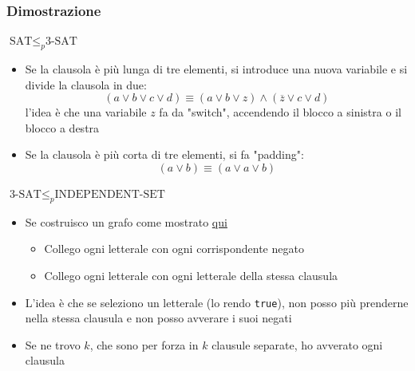 \subsubsection{Dimostrazione}
$ \text{SAT} \leq_p \text{3-SAT} $
\begin{itemize}
	\item Se la clausola è più lunga di tre elementi, si introduce una nuova variabile e si divide la clausola in due:
	      \[
		      (a \lor b \lor c \lor d) \equiv (a \lor b \lor z) \land (\overline{z} \lor c \lor d)
	      \]
	      l'idea è che una variabile $ z $ fa da "switch", accendendo il blocco a sinistra o il blocco a destra
	\item Se la clausola è più corta di tre elementi, si fa "padding":
	      \[
		      (a \lor b) \equiv (a \lor a \lor b)
	      \]
\end{itemize}
$ \text{3-SAT} \leq_p \text{INDEPENDENT-SET} $
\begin{itemize}
	\item Se costruisco un grafo come mostrato \hyperref[3-sat graph]{qui}
	      \begin{itemize}
		      \item Collego ogni letterale con ogni corrispondente negato
		      \item Collego ogni letterale con ogni letterale della stessa clausula
	      \end{itemize}
	\item L'idea è che se seleziono un letterale (lo rendo \verb|true|), non posso più prenderne nella stessa clausula e non posso avverare i suoi negati
	\item Se ne trovo $ k $, che sono per forza in $ k $ clausule separate, ho avverato ogni clausula
\end{itemize}


